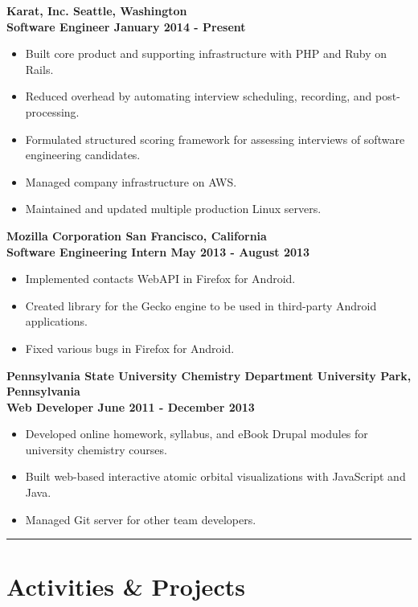 \documentclass[letterpaper]{article}
\newcommand{\sectionrule}[1] {
  \noindent\rule{\textwidth}{.1mm}
  \vspace{-11mm}
  \section{#1}
}
\newenvironment{indentsection}
  {\begin{adjustwidth}{10mm}{0pt}}
  {\end{adjustwidth}}
\newcommand{\job}[5] {
  \noindent\textbf{#1 \hfill #2}\\
  \textbf{#3 \hfill #4 - #5}

  \vspace{1mm}
}
\begin{document}
  \begin{indentsection}
    \job{Karat, Inc.}{Seattle, Washington}{Software Engineer}{January 2014}{Present}
    \begin{itemize}
      \item Built core product and supporting infrastructure with PHP and Ruby on Rails.
      \item Reduced overhead by automating interview scheduling, recording, and post-processing.
      \item Formulated structured scoring framework for assessing interviews of software engineering candidates.
      \item Managed company infrastructure on AWS.
      \item Maintained and updated multiple production Linux servers.
    \end{itemize}

    \vspace{5mm}

    \job{Mozilla Corporation}{San Francisco, California}{Software Engineering Intern}{May 2013}{August 2013}
    \begin{itemize}
      \item Implemented contacts WebAPI in Firefox for Android.
      \item Created library for the Gecko engine to be used in third-party Android applications.
      \item Fixed various bugs in Firefox for Android.
    \end{itemize}

    \vspace{5mm}

    \job{Pennsylvania State University Chemistry Department}{University Park, Pennsylvania}{Web Developer}{June 2011}{December 2013}
    \begin{itemize}
      \item Developed online homework, syllabus, and eBook Drupal modules for university chemistry courses.
      \item Built web-based interactive atomic orbital visualizations with JavaScript and Java.
      \item Managed Git server for other team developers.
    \end{itemize}
  \end{indentsection}

  \sectionrule{Activities \& Projects}
\end{document}
